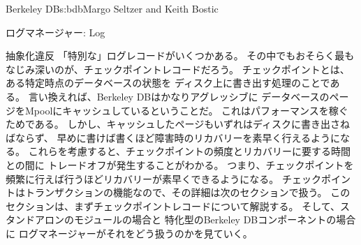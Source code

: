 \begin{aosachapter}{Berkeley DB}{s:bdb}{Margo Seltzer and Keith Bostic}
\begin{aosasect1}{ログマネージャー: Log}
\begin{aosasect2}{抽象化違反}
「特別な」ログレコードがいくつかある。
その中でもおそらく最もなじみ深いのが、チェックポイントレコードだろう。
チェックポイントとは、ある特定時点のデータベースの状態を
ディスク上に書き出す処理のことである。
言い換えれば、Berkeley DBはかなりアグレッシブに
データベースのページをMpoolにキャッシュしているということだ。
これはパフォーマンスを稼ぐためである。
しかし、キャッシュしたページもいずれはディスクに書き出さねばならず、
早めに書けば書くほど障害時のリカバリーを素早く行えるようになる。
これらを考慮すると、チェックポイントの頻度とリカバリーに要する時間との間に
トレードオフが発生することがわかる。
つまり、チェックポイントを頻繁に行えば行うほどリカバリーが素早くできるようになる。
チェックポイントはトランザクションの機能なので、その詳細は次のセクションで扱う。
このセクションは、まずチェックポイントレコードについて解説する。
そして、スタンドアロンのモジュールの場合と
特化型のBerkeley DBコンポーネントの場合に
ログマネージャーがそれをどう扱うのかを見ていく。


\end{aosasect2}
\end{aosasect1}
\end{aosachapter}
